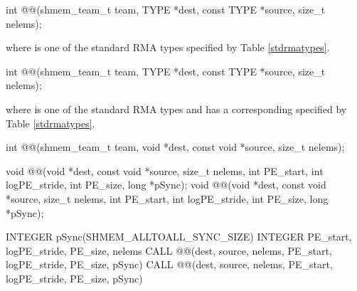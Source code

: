 
\begin{apidefinition}

{\color{Green}
\begin{C11synopsis}
int @@(shmem_team_t team, TYPE *dest, const TYPE *source, size_t nelems);
\end{C11synopsis}
where \TYPE{} is one of the standard \ac{RMA} types specified by Table \ref{stdrmatypes}.
}

\begin{Csynopsis}
\end{Csynopsis}
{\color{Green}
\begin{CsynopsisCol}
int @@(shmem_team_t team, TYPE *dest, const TYPE *source, size_t nelems);
\end{CsynopsisCol}
where \TYPE{} is one of the standard \ac{RMA} types and has a corresponding \TYPENAME{} specified by Table \ref{stdrmatypes}.

\begin{CsynopsisCol}
int @@(shmem_team_t team, void *dest, const void *source, size_t nelems);
\end{CsynopsisCol}
}

\begin{DeprecateBlock}
\begin{CsynopsisCol}
void @@(void *dest, const void *source, size_t nelems, int PE_start, int logPE_stride, int PE_size, long *pSync);
void @@(void *dest, const void *source, size_t nelems, int PE_start, int logPE_stride, int PE_size, long *pSync);
\end{CsynopsisCol}
\end{DeprecateBlock}

\begin{Fsynopsis}
INTEGER pSync(SHMEM_ALLTOALL_SYNC_SIZE)
INTEGER PE_start, logPE_stride, PE_size, nelems
CALL @@(dest, source, nelems, PE_start, logPE_stride, PE_size, pSync)
CALL @@(dest, source, nelems, PE_start, logPE_stride, PE_size, pSync)
\end{Fsynopsis}

\begin{apiarguments}


\end{apiarguments}
\end{apidefinition}
